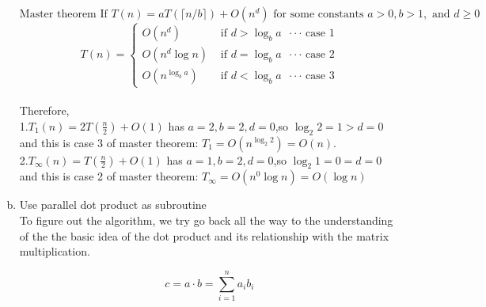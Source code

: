 \documentclass{article}
\begin{document}
\begin{enumerate}[(a)]
$\text {Master theorem} \text { If } T(n)=a T(\lceil n / b\rceil)+O\left(n^{d}\right) \text { for some constants } a>0, b>1, \text { and } d \geq 0$ 
\begin{equation*}
T(n)=\left\{\begin{array}{ll}{O\left(n^{d}\right)} & {\text { if } d>\log _{b} a\text{\ $\cdot \cdot \cdot $ case 1}} \\ {O\left(n^{d} \log n\right)} & {\text { if } d=\log _{b} a\text{\ $\cdot \cdot \cdot$ case 2}} \\ {O\left(n^{\log _{b} a}\right)} & {\text { if } d<\log _{b} a\text{\ $\cdot \cdot \cdot $ case 3}}\end{array}\right.
\end{equation*}\\
Therefore, \\
1.$T_1(n)=2T(\frac{n}{2})+O(1)$ has $a=2,b=2,d=0$,so $\log_{2}2=1>d=0$ and this is case 3 of master theorem: $T_1={O(n^{\log_{2}2})=O(n)}$. \\
2.$T_\infty(n)=T(\frac{n}{2})+O(1)$ has $a=1,b=2,d=0$,so $\log_{2}1=0=d=0$ and this is case 2 of master theorem: $T_\infty=O(n^0\log n)=O(\log n)$
\newpage
\item Use parallel dot product as subroutine\\
To figure out the algorithm, we try go back all the way to the understanding of the the basic idea of the dot product and its relationship with the matrix multiplication. 

\begin{equation*}
c=a \cdot b = \sum_{i=1}^{n} a_{i} b_{i}
\end{equation*}


\end{enumerate}
\end{document}
